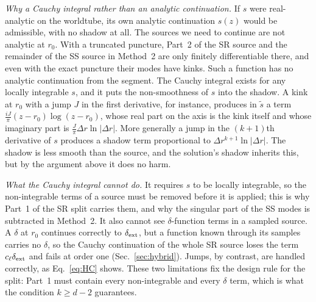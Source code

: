 \documentclass[aps,prd,twocolumn,superscriptaddress,nofootinbib,floatfix]{revtex4-2}
\newcommand{\dext}{\delta_{\rm ext}}
\begin{document}
\emph{Why a Cauchy integral rather than an analytic continuation.}
If $s$ were real-analytic on the worldtube, its own analytic continuation $s(z)$ would be admissible, with no shadow at all.
The sources we need to continue are not analytic at $r_0$.
With a truncated puncture, Part~2 of the SR source and the remainder of the SS source in Method~2 are only finitely differentiable there, and even with the exact puncture their modes have kinks.
Such a function has no analytic continuation from the segment.
The Cauchy integral exists for any locally integrable $s$, and it puts the non-smoothness of $s$ into the shadow.
A kink at $r_0$ with a jump $J$ in the first derivative, for instance, produces in $\tilde s$ a term $\tfrac{iJ}{\pi}(z-r_0)\log(z-r_0)$, whose real part on the axis is the kink itself and whose imaginary part is $\tfrac{J}{\pi}\Delta r\ln|\Delta r|$.
More generally a jump in the $(k+1)$th derivative of $s$ produces a shadow term proportional to $\Delta r^{k+1}\ln|\Delta r|$.
The shadow is less smooth than the source, and the solution's shadow inherits this, but by the argument above it does no harm.

\emph{What the Cauchy integral cannot do.}
It requires $s$ to be locally integrable, so the non-integrable terms of a source must be removed before it is applied; this is why Part~1 of the SR split carries them, and why the singular part of the SS modes is subtracted in Method~2.
It also cannot see $\delta$-function terms in a sampled source.
A $\delta$ at $r_0$ continues correctly to $\dext$, but a function known through its samples carries no $\delta$, so the Cauchy continuation of the whole SR source loses the term $c_\ell\dext$ and fails at order one (Sec.~\ref{sec:hybrid}).
Jumps, by contrast, are handled correctly, as Eq.~\eqref{eq:HC} shows.
These two limitations fix the design rule for the split: Part~1 must contain every non-integrable and every $\delta$ term, which is what the condition $k\ge d-2$ guarantees.
\end{document}
